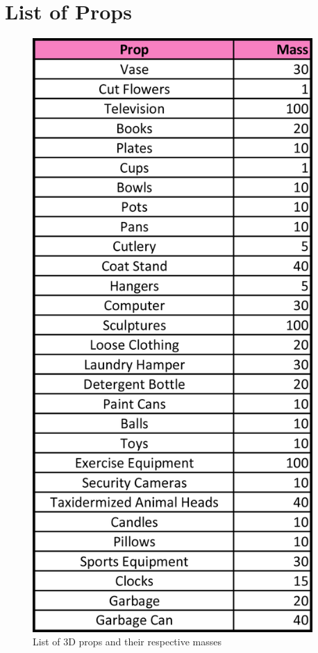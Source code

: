 \clearpage
\section{List of Props}

\begin{figure}[H]
\centering
  \caption{List of 3D props and their respective masses}
  \label{fig:props_list}
  \includegraphics[width=0.95\textwidth, height=0.5\paperheight, keepaspectratio=true]{images/table_3D_props}
\end{figure}

